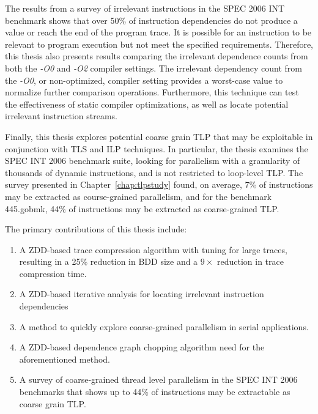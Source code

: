 \documentclass[defaultstyle,11pt]{thesis}
\begin{document}
The results from a survey of irrelevant instructions in the SPEC 2006
INT benchmark shows that over 50\% of instruction dependencies do not
produce a value or reach the end of the program trace.  It is possible
for an instruction to be relevant to program execution but not meet
the specified requirements.  Therefore, this thesis also presents
results comparing the irrelevant dependence counts from both the
\textit{-O0} and \textit{-O2} compiler settings. The irrelevant
dependency count from the \textit{-O0}, or non-optimized, compiler
setting provides a worst-case value to normalize further comparison
operations.  Furthermore, this technique can test the effectiveness of
static compiler optimizations, as well as locate potential irrelevant
instruction streams.

Finally, this thesis explores potential coarse grain TLP that may be
exploitable in conjunction with TLS and ILP techniques.  In
particular, the thesis examines the SPEC INT 2006 benchmark suite,
looking for parallelism with a granularity of thousands of dynamic
instructions, and is not restricted to loop-level TLP. The survey
presented in Chapter~\ref{chap:tlpstudy} found, on average, 7\% of
instructions may be extracted as course-grained parallelism, and for
the benchmark 445.gobmk, 44\% of instructions may be extracted as
coarse-grained TLP.

The primary contributions of this thesis include:

\begin{enumerate}
\item A ZDD-based trace compression algorithm with tuning for large
  traces, resulting in a 25\% reduction in BDD size and a $9\times$
  reduction in trace compression time.
\item A ZDD-based iterative analysis for locating irrelevant
  instruction dependencies
\item A method to quickly explore coarse-grained parallelism in serial
  applications.
\item A ZDD-based dependence graph chopping algorithm need for the
  aforementioned method.
\item A survey of coarse-grained thread level parallelism in the SPEC
  INT 2006 benchmarks that shows up to 44\% of instructions may be
  extractable as coarse grain TLP.
\end{enumerate}

\end{document}
